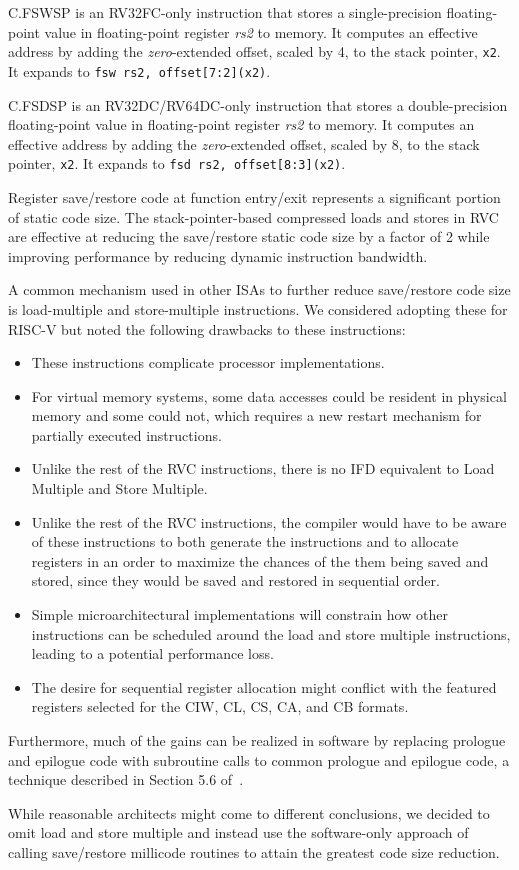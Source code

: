C.FSWSP is an RV32FC-only instruction that stores a single-precision
floating-point value in floating-point register {\em rs2} to memory.  It
computes an effective address by adding the {\em zero}-extended offset, scaled
by 4, to the stack pointer, {\tt x2}.  It expands to {\tt fsw rs2,
offset[7:2](x2)}.

C.FSDSP is an RV32DC/RV64DC-only instruction that stores a double-precision
floating-point value in floating-point register {\em rs2} to memory.  It
computes an effective address by adding the {\em zero}-extended offset, scaled
by 8, to the stack pointer, {\tt x2}.  It expands to {\tt fsd rs2,
offset[8:3](x2)}.

\begin{commentary}
Register save/restore code at function entry/exit represents a
significant portion of static code size.  The stack-pointer-based
compressed loads and stores in RVC are effective at reducing the
save/restore static code size by a factor of 2 while improving
performance by reducing dynamic instruction bandwidth.

A common mechanism used in other ISAs to further reduce
save/restore code size is load-multiple and store-multiple
instructions.  We considered adopting these for RISC-V but noted the
following drawbacks to these instructions:
\begin{itemize}
\item These instructions complicate processor implementations.
\item For virtual memory systems, some data accesses could be
      resident in physical memory and some could not, which requires a
      new restart mechanism for partially executed instructions.
\item Unlike the rest of the RVC instructions, there is no IFD
      equivalent to Load Multiple and Store Multiple.
\item Unlike the rest of the RVC instructions, the compiler would
      have to be aware of these instructions to both generate the
      instructions and to allocate registers in an order to maximize
      the chances of the them being saved and stored, since they would
      be saved and restored in sequential order.
\item Simple microarchitectural implementations will constrain how
      other instructions can be scheduled around the load and store
      multiple instructions, leading to a potential performance loss.
\item The desire for sequential register allocation might conflict with
      the featured registers selected for the CIW, CL, CS, CA, and CB formats.
\end{itemize}
Furthermore, much of the gains can be realized in software by replacing
prologue and epilogue code with subroutine calls to common
prologue and epilogue code, a technique described in
Section 5.6 of~\cite{waterman-phd}.

While reasonable architects might come to different conclusions, we
decided to omit load and store multiple and instead use the
software-only approach of calling save/restore millicode routines to
attain the greatest code size reduction.
\end{commentary}

